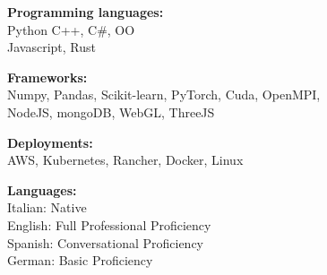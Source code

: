 \documentclass[letterpaper,10pt]{article}
\begin{document}
\begin{minipage}[ht]{0.48\textwidth}
\textbf{Programming languages:} \\
Python C++, C\#, OO \\ Javascript, Rust
\vspace{1em}

\textbf{Frameworks:} \\
Numpy, Pandas, Scikit-learn, PyTorch, Cuda, OpenMPI, \\ 
NodeJS, mongoDB, WebGL, ThreeJS

\end{minipage}
\begin{minipage}[ht]{0.48\textwidth}
\textbf{Deployments:} \\
AWS, Kubernetes, Rancher, Docker, Linux

\vspace{1em}
\textbf{Languages:} \\
Italian: Native \\
English: Full Professional Proficiency\\
Spanish: Conversational Proficiency \\
German: Basic Proficiency

\end{minipage}


\end{document}

